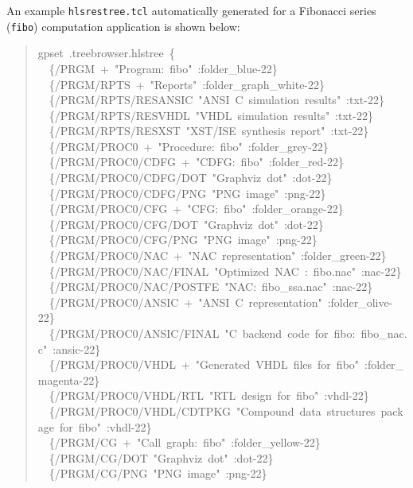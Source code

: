 \documentclass[a4paper]{article}
\begin{document}
An example \texttt{hlsrestree.tcl} automatically generated for a Fibonacci series (\texttt{fibo}) computation application is shown below:
%
\begin{quote}{\ttfamily \footnotesize \raggedright \noindent
gpset~.treebrowser.hlstree~\{\\
~~\{/PRGM~+~"Program:~fibo"~:folder\_blue-22\}\\
~~\{/PRGM/RPTS~+~"Reports"~:folder\_graph\_white-22\}\\
~~\{/PRGM/RPTS/RESANSIC~"ANSI~C~simulation~results"~:txt-22\}\\
~~\{/PRGM/RPTS/RESVHDL~"VHDL~simulation~results"~:txt-22\}\\
~~\{/PRGM/RPTS/RESXST~"XST/ISE~synthesis~report"~:txt-22\}\\
~~\{/PRGM/PROC0~+~"Procedure:~fibo"~:folder\_grey-22\}\\
~~\{/PRGM/PROC0/CDFG~+~"CDFG:~fibo"~:folder\_red-22\}\\
~~\{/PRGM/PROC0/CDFG/DOT~"Graphviz~dot"~:dot-22\}\\
~~\{/PRGM/PROC0/CDFG/PNG~"PNG~image"~:png-22\}\\
~~\{/PRGM/PROC0/CFG~+~"CFG:~fibo"~:folder\_orange-22\}\\
~~\{/PRGM/PROC0/CFG/DOT~"Graphviz~dot"~:dot-22\}\\
~~\{/PRGM/PROC0/CFG/PNG~"PNG~image"~:png-22\}\\
~~\{/PRGM/PROC0/NAC~+~"NAC~representation"~:folder\_green-22\}\\
~~\{/PRGM/PROC0/NAC/FINAL~"Optimized~NAC~:~fibo.nac"~:nac-22\}\\
~~\{/PRGM/PROC0/NAC/POSTFE~"NAC:~fibo\_ssa.nac"~:nac-22\}\\
~~\{/PRGM/PROC0/ANSIC~+~"ANSI~C~representation"~:folder\_olive-22\}\\
~~\{/PRGM/PROC0/ANSIC/FINAL~"C~backend~code~for~fibo:~fibo\_nac.c"~:ansic-22\}\\
~~\{/PRGM/PROC0/VHDL~+~"Generated~VHDL~files~for~fibo"~:folder\_magenta-22\}\\
~~\{/PRGM/PROC0/VHDL/RTL~"RTL~design~for~fibo"~:vhdl-22\}\\
~~\{/PRGM/PROC0/VHDL/CDTPKG~"Compound~data~structures~package~for~fibo"~:vhdl-22\}\\
~~\{/PRGM/CG~+~"Call~graph:~fibo"~:folder\_yellow-22\}\\
~~\{/PRGM/CG/DOT~"Graphviz~dot"~:dot-22\}\\
~~\{/PRGM/CG/PNG~"PNG~image"~:png-22\}\\
}
\end{quote}
\end{document}
